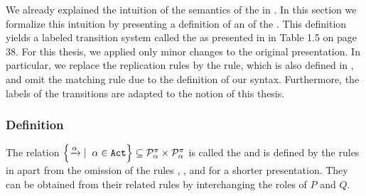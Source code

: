 We already explained the intuition of the semantics of the \picalc{} in . In this section we formalize this intuition by presenting a definition of an  of the \picalc{}. This definition yields a labeled transition system called the  as presented in \cite{sangiorgi} in Table 1.5 on page 38. For this thesis, we applied only minor changes to the original presentation. %
In particular, we replace the replication rules by the \ecall{} rule, which is also defined in \cite{sangiorgi}, and omit the matching rule due to the definition of our syntax. Furthermore, the labels of the transitions are adapted to the notion of this thesis.

\subsubsection{Definition}



\begin{definition}
\label{def_early_trans_system}
The relation $\set[\alpha\in\actions]{\transs{\alpha}}\subseteq\procs_\alpha\times\procs_\alpha$ is called the  and is defined by the rules in  apart from the omission of the rules \esumr{}, \eparr{}, \ecomr{} and \ecloser{} for a shorter presentation. They can be obtained from their related rules by interchanging the roles of $P$ and $Q$.
\end{definition}



